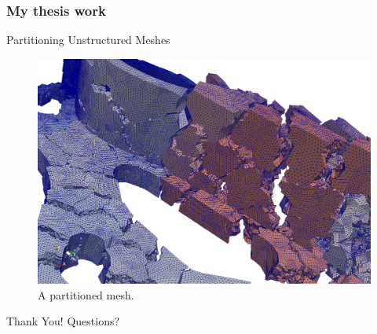 \documentclass{beamer}
\begin{document}
\begin{frame}
  \frametitle{My thesis work}
  \center Partitioning Unstructured Meshes
   \begin{figure} \centering 
     \includegraphics[width=.8\textwidth]{figs/mesh/upright512explodedWithEdgesZoom.png}
     \caption{A partitioned mesh.}
  \end{figure}
\end{frame}

\begin{frame}
  \center Thank You!
  \center Questions?
\end{frame}
\end{document}

